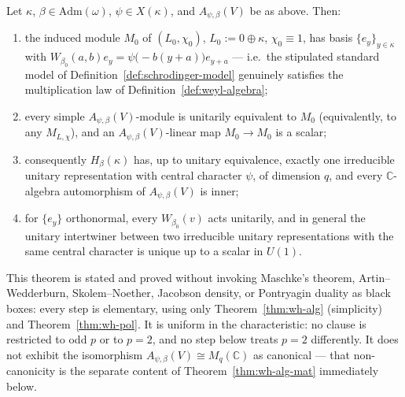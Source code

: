 \statusProved
\begin{theorem}
\label{thm:wh-svn}
Let $\kappa$, $\beta\in\mathrm{Adm}(\omega)$, $\psi\in X(\kappa)$, and
$A_{\psi,\beta}(V)$ be as above. Then:
\begin{enumerate}[label=(\alph*)]
\item the induced module $M_0$ of $(L_0,\chi_0)$, $L_0:=0\oplus\kappa$,
$\chi_0\equiv 1$, has basis $\{e_y\}_{y\in\kappa}$ with
$W_{\beta_0}(a,b)e_y = \psi\big(-b(y+a)\big)e_{y+a}$ — i.e.\ the stipulated
standard model of Definition~\ref{def:schrodinger-model} genuinely satisfies
the multiplication law of Definition~\ref{def:weyl-algebra};
\item every simple $A_{\psi,\beta}(V)$-module is unitarily equivalent to
$M_0$ (equivalently, to any $M_{L,\chi}$), and an $A_{\psi,\beta}(V)$-linear
map $M_0\to M_0$ is a scalar;
\item consequently $H_\beta(\kappa)$ has, up to unitary equivalence, exactly
one irreducible unitary representation with central character $\psi$, of
dimension $q$, and every $\mathbb{C}$-algebra automorphism of
$A_{\psi,\beta}(V)$ is inner;
\item for $\{e_y\}$ orthonormal, every $W_{\beta_0}(v)$ acts unitarily, and
in general the unitary intertwiner between two irreducible unitary
representations with the same central character is unique up to a scalar
in $U(1)$.
\end{enumerate}
\end{theorem}

\begin{scope}
This theorem is stated and proved without invoking Maschke's theorem,
Artin--Wedderburn, Skolem--Noether, Jacobson density, or Pontryagin duality
as black boxes: every step is elementary, using only
Theorem~\ref{thm:wh-alg} (simplicity) and Theorem~\ref{thm:wh-pol}. It is
uniform in the characteristic: no clause is restricted to odd $p$ or to
$p=2$, and no step below treats $p=2$ differently. It does not exhibit the
isomorphism $A_{\psi,\beta}(V)\cong M_q(\mathbb{C})$ as canonical — that
non-canonicity is the separate content of Theorem~\ref{thm:wh-alg-mat}
immediately below.
\end{scope}


